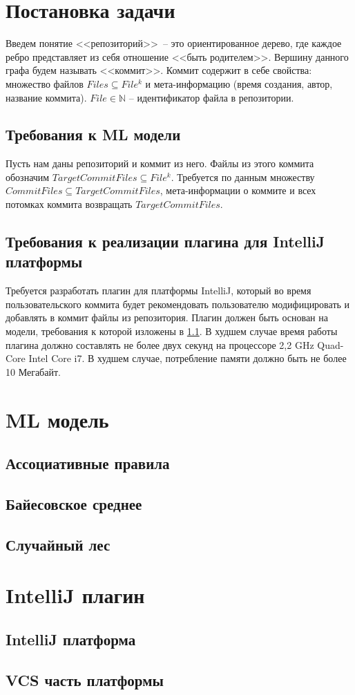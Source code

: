 \section{Постановка задачи}
Введем понятие <<репозиторий>>~-- это ориентированное дерево, где каждое ребро представляет из себя отношение <<быть родителем>>. Вершину данного графа будем называть <<коммит>>. Коммит содержит в себе свойства: множество файлов $Files \subseteq File^k$ и мета-информацию (время создания, автор, название коммита). $File \in \mathbb{N}$ -- идентификатор файла в репозитории.\\
\subsection{Требования к ML модели}\label{ml-model-req}
Пусть нам даны репозиторий и коммит из него. Файлы из этого коммита обозначим $TargetCommitFiles \subseteq File^k$. Требуется по данным множеству $CommitFiles \subseteq TargetCommitFiles$, мета-информации о коммите и всех потомках коммита возвращать $TargetCommitFiles$.
\subsection{Требования к реализации плагина для IntelliJ платформы}\label{impl-req}
Требуется разработать плагин для платформы IntelliJ, который во время пользовательского коммита будет рекомендовать пользователю модифицировать и добавлять в коммит файлы из репозитория. Плагин должен быть основан на модели, требования к которой изложены в \ref{ml-model-req}. В худшем случае время работы плагина должно составлять не более двух секунд на процессоре 2,2 GHz Quad-Core Intel Core i7. В худшем случае, потребление памяти должно быть не более 10 Мегабайт.
\section{ML модель}
\subsection{Ассоциативные правила}
\subsection{Байесовское среднее}
\subsection{Случайный лес}
\section{IntelliJ плагин}
\subsection{IntelliJ платформа}
\subsection{VCS часть платформы}
\chapterconclusion